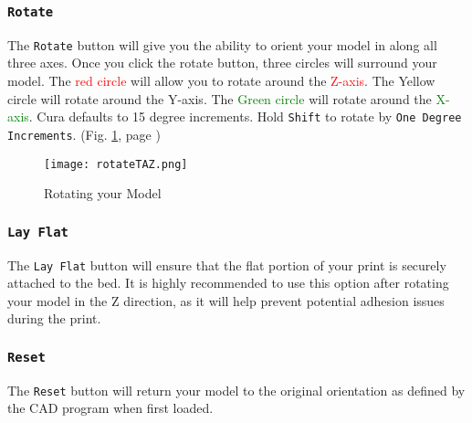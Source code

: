 \subsubsection{\texttt{Rotate}}
The \texttt{Rotate} button will give you the ability to orient your model in along all three axes. Once you click the rotate button, three circles will surround your model. The \textcolor{red}{red circle} will allow you to rotate around the \textcolor{red}{Z-axis}. The \textcolor{yellow1}{Yellow circle} will rotate around the \textcolor{yellow1}{Y-axis}. The \textcolor{green}{Green circle} will rotate around the \textcolor{green}{X-axis}. Cura defaults to 15 degree increments. Hold \texttt{Shift} to rotate by \texttt{One Degree Increments}. (Fig. \ref{fig:Rotating your Model}, page \pageref{fig:Rotating your Model}) 
\begin{figure}[H]
\centering
\texttt{[image: rotateTAZ.png]}
\caption{Rotating your Model}
\label{fig:Rotating your Model}
\end{figure}

\subsubsection{\texttt{Lay Flat}}
The \texttt{Lay Flat} button will ensure that the flat portion of your print is securely attached to the bed. It is highly recommended to use this option after rotating your model in the Z direction, as it will help prevent potential adhesion issues during the print.

\subsubsection{\texttt{Reset}}
The \texttt{Reset} button will return your model to the original orientation as defined by the CAD program when first loaded.

